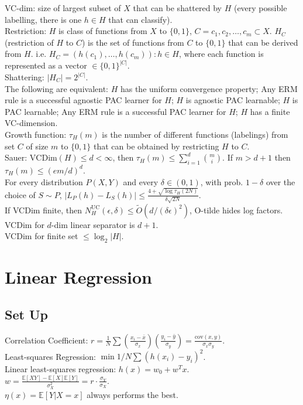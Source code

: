 VC-dim: size of largest subset of $X$ that can be shattered by $H$ (every possible labelling, there is one $h \in H$ that can classify).\\
Restriction: $H$ is class of functions from $X$ to $\{0, 1\}$, $C={c_1, c_2, \dots, c_m} \subset X$. $H_C$ (restriction of $H$ to $C$) is the set of functions from $C$ to $\{0, 1\}$ that can be derived from $H$. i.e. $H_C = {(h(c_1), \dots, h(c_m)): h\in H}$, where each function is represented as a vector $\in \{0, 1\}^{|C|}$.\\
Shattering: $|H_C| = 2^{|C|}$.\\
The following are equivalent: $H$ has the uniform convergence property; Any ERM rule is a successful agnostic PAC learner for $H$; $H$ is agnostic PAC learnable; $H$ is PAC learnable; Any ERM rule is a successful PAC learner for $H$; $H$ has a finite VC-dimension.\\
Growth function: $\tau_H(m)$ is the number of different functions (labelings) from set $C$ of size $m$ to $\{0, 1\}$ that can be obtained by restricting $H$ to $C$.\\
Sauer: $\text{VCDim}(H) \leq d < \infty$, then $\tau_H(m) \leq \sum_{i=1}^d \binom{m}{i}$. If $m > d + 1$ then $\tau_H(m) \leq (em/d)^d$.\\
For every distribution $P(X, Y)$ and every $\delta \in (0, 1)$, with prob. $1 - \delta$ over the choice of $S \sim P$, $|L_P(h) - L_S(h)| \leq \frac{4 + \sqrt{\log \tau_H(2N)}}{\delta \sqrt{2N}}$.\\
If VCDim finite, then $N_{H}^{\text{UC}}(\epsilon, \delta) \leq \widetilde{O}(d/(\delta \epsilon)^2)$, O-tilde hides log factors.\\
VCDim for $d$-dim linear separator is $d+1$.\\
VCDim for finite set $\leq \log_2|H|$.

\section{Linear Regression}

\subsection*{Set Up}

Correlation Coefficient: $r = \frac{1}{N} \sum \left(\frac{x_i-\bar{x}}{\sigma_x}\right)\left(\frac{y_i-\bar{y}}{\sigma_y}\right) = \frac{\text{cov}(x, y)}{\sigma_x \sigma_y}$.\\
Least-squares Regression: $\min 1/N \sum(h(x_i) - y_i)^2$.\\
Linear least-squares regression: $h(x) = w_0+ w^T x$.\\
$w = \frac{\mathbb{E}[XY] - \mathbb{E}[X]\mathbb{E}[Y]}{\sigma_X^2} = r \cdot \frac{\sigma_Y}{\sigma_X}$.\\
$\eta(x) = \mathbb{E}[Y|X = x]$ always performs the best.\\

